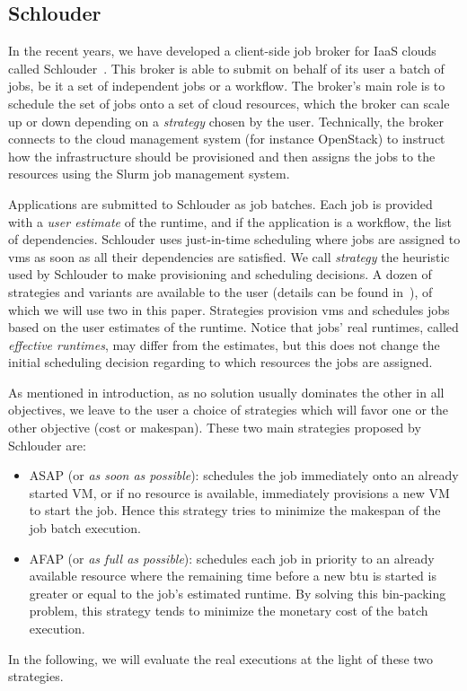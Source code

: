 \documentclass[10pt,conference,compsocconf]{IEEEtran}
\begin{document}
\subsection{Schlouder}
In the recent years, we have developed a client-side job broker for IaaS clouds
called Schlouder~\cite{Michon17}. This broker is able to submit on behalf of its
user a  batch of  jobs, be  it a  set of  independent jobs  or a  workflow.  The
broker's main role is to schedule the set of jobs onto a set of cloud resources,
which the broker can  scale up or down depending on  a \emph{strategy} chosen by
the user.  Technically, the broker connects  to the cloud management system (for
instance OpenStack) to  instruct how the infrastructure  should be provisioned
and  then assigns  the jobs  to  the resources  using the  Slurm job  management
system. 

Applications are  submitted to Schlouder  as job  batches. Each job  is provided
with  a  \emph{user estimate}  of  the  runtime, and  if  the  application is  a
workflow, the list of dependencies. Schlouder uses just-in-time scheduling where
jobs  are  assigned   to  \acp{vm}  as  soon  as  all   their  dependencies  are
satisfied.  We call  \emph{strategy} the  heuristic  used by  Schlouder to  make
provisioning and scheduling  decisions.  A dozen of strategies  and variants are
available to  the user (details can  be found in~\cite{GenaudG11}), of  which we
will use  two in this  paper. Strategies  provision \acp{vm} and  schedules jobs
based on  the user estimates of  the runtime.  Notice that  jobs' real runtimes,
called \emph{effective runtimes},  may differ from the estimates,  but this does
not change the initial scheduling decision regarding to which resources the jobs
are assigned.

As mentioned in introduction, as no solution usually dominates the other in all
objectives, we leave to the user a choice of strategies which will favor one or
the other objective (cost or makespan). These two main strategies proposed by
Schlouder are:
\begin{itemize}
\item ASAP (or \textit{as soon as possible}): schedules the job immediately onto
  an already started VM, or if  no resource is available, immediately provisions
  a new VM to start the job.  Hence this strategy tries to minimize the makespan
  of the job batch execution.

\item AFAP (or \textit{as full as  possible}): schedules each job in priority to
	an already  available resource where  the remaining time  before a new
	\ac{btu} is started is greater or equal to the job's estimated runtime.
	By solving this bin-packing problem, this strategy tends to minimize the
	monetary cost of the batch execution.
\end{itemize}
In the following, we will evaluate the real executions at the light of these two
strategies.
\end{document}
